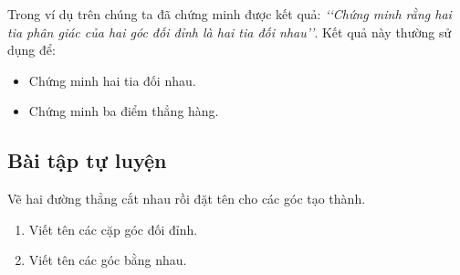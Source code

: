 \begin{nx}
	Trong ví dụ trên chúng ta đã chứng minh được kết quả:
	{\it \lq\lq Chứng minh rằng hai tia phân giác của hai góc đối đỉnh là hai tia đối nhau\rq\rq}. Kết quả này thường sử dụng để:
	\begin{itemize}
		\item Chứng minh hai tia đối nhau.
		\item Chứng minh ba điểm thẳng hàng.
	\end{itemize}
\end{nx}
\subsection{Bài tập tự luyện}
\begin{bt}%
	Vẽ hai đường thẳng cắt nhau rồi đặt tên cho các góc tạo thành.
	\begin{enumerate}
	\item Viết tên các cặp góc đối đỉnh.
	\item Viết tên các góc bằng nhau.
	\end{enumerate}
\end{bt}
